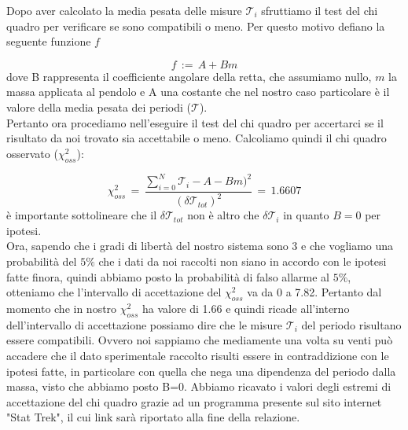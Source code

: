 Dopo aver calcolato la media pesata delle misure $\mathcal{T}_i$ sfruttiamo il test del chi quadro per verificare se sono compatibili o meno. Per questo motivo defiano la seguente funzione $f$

\begin{equation}
	f \,:=\, A + B m 
\end{equation}
%
dove B rappresenta il coefficiente angolare della retta, che assumiamo nullo, $m$ la massa applicata al pendolo e A una costante che nel nostro caso particolare è il valore della media pesata dei periodi ($\mathcal{T}$).\\
Pertanto ora procediamo nell'eseguire il test del chi quadro per accertarci se il risultato da noi trovato sia accettabile o meno. Calcoliamo quindi il chi quadro osservato ($\chi_{oss}^2$):

\begin{equation*}
	\chi_{oss}^2 \,=\, \frac{\sum_{i=0}^{N} \mathcal{T}_i - A - B m)^2}{(\delta \mathcal{T}_{tot})^2} \,=\, 1.6607
\end{equation*}
%
è importante sottolineare che il $\delta \mathcal{T}_{tot}$ non è altro che $\delta \mathcal{T}_i$ in quanto $B = 0$ per ipotesi.\\
Ora, sapendo che i gradi di libertà del nostro sistema sono 3 e che vogliamo una probabilità del $5\%$ che i dati da noi raccolti non siano in accordo con le ipotesi fatte finora, quindi abbiamo posto la probabilità di falso allarme al $5\%$, otteniamo che l'intervallo di accettazione del $\chi_{oss}^2$ va da 0 a 7.82. Pertanto dal momento che in nostro $\chi_{oss}^2$ ha valore di 1.66 e quindi ricade all'interno dell'intervallo di accettazione possiamo dire che le misure $\mathcal{T}_i$ del periodo risultano essere compatibili. Ovvero noi sappiamo che mediamente una volta su venti può accadere che il dato sperimentale raccolto risulti essere in contraddizione con le ipotesi fatte, in particolare con quella che nega una dipendenza del periodo dalla massa, visto che abbiamo posto B=0.
Abbiamo ricavato i valori degli estremi di accettazione del chi quadro grazie ad un programma presente sul sito internet "Stat Trek", il cui link sarà riportato alla fine della relazione.